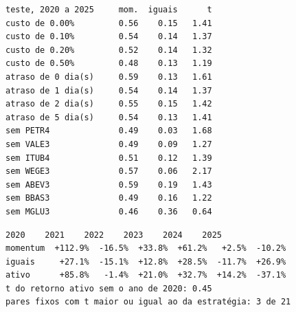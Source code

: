 \begin{lstlisting}[style=saida]
teste, 2020 a 2025     mom.  iguais      t
custo de 0.00%         0.56    0.15   1.41
custo de 0.10%         0.54    0.14   1.37
custo de 0.20%         0.52    0.14   1.32
custo de 0.50%         0.48    0.13   1.19
atraso de 0 dia(s)     0.59    0.13   1.61
atraso de 1 dia(s)     0.54    0.14   1.37
atraso de 2 dia(s)     0.55    0.15   1.42
atraso de 5 dia(s)     0.54    0.13   1.41
sem PETR4              0.49    0.03   1.68
sem VALE3              0.49    0.09   1.27
sem ITUB4              0.51    0.12   1.39
sem WEGE3              0.57    0.06   2.17
sem ABEV3              0.59    0.19   1.43
sem BBAS3              0.49    0.16   1.22
sem MGLU3              0.46    0.36   0.64
\end{lstlisting}
\begin{lstlisting}[style=saida]
             2020    2021    2022    2023    2024    2025
momentum  +112.9%  -16.5%  +33.8%  +61.2%   +2.5%  -10.2%
iguais     +27.1%  -15.1%  +12.8%  +28.5%  -11.7%  +26.9%
ativo      +85.8%   -1.4%  +21.0%  +32.7%  +14.2%  -37.1%
t do retorno ativo sem o ano de 2020: 0.45
pares fixos com t maior ou igual ao da estratégia: 3 de 21
\end{lstlisting}



